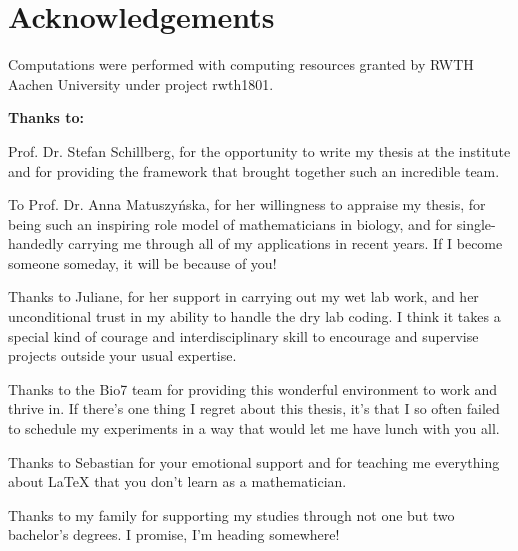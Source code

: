 \section*{Acknowledgements}

Computations were performed with computing resources granted by RWTH Aachen University under project rwth1801.

\vspace{0.5cm}

\noindent \textbf{Thanks to:}

Prof. Dr. Stefan Schillberg, for the opportunity to write my thesis at the institute and for providing the framework that brought together such an incredible team.

\vspace{0.3cm}

To Prof. Dr. Anna Matuszyńska, for her willingness to appraise my thesis, for being such an inspiring role model of mathematicians in biology, and for single-handedly carrying me through all of my applications in recent years. If I become someone someday, it will be because of you!

\vspace{0.3cm}

Thanks to Juliane, for her support in carrying out my wet lab work, and her unconditional trust in my ability to handle the dry lab coding. I think it takes a special kind of courage and interdisciplinary skill to encourage and supervise projects outside your usual expertise.

\vspace{0.3cm}

Thanks to the Bio7 team for providing this wonderful environment to work and thrive in. If there's one thing I regret about this thesis, it's that I so often failed to schedule my experiments in a way that would let me have lunch with you all.

\vspace{0.3cm}

Thanks to Sebastian for your emotional support and for teaching me everything about \LaTeX{} that you don't learn as a mathematician.

\vspace{0.3cm}

Thanks to my family for supporting my studies through not one but two bachelor's degrees. I promise, I'm heading somewhere!
